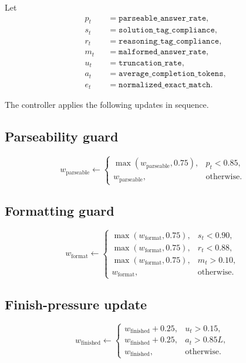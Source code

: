 \documentclass[11pt]{article}
\begin{document}
Let
\begin{align*}
&p_t &&= \texttt{parseable\_answer\_rate}, \\
&s_t &&= \texttt{solution\_tag\_compliance}, \\
&r_t &&= \texttt{reasoning\_tag\_compliance}, \\
&m_t &&= \texttt{malformed\_answer\_rate}, \\
&u_t &&= \texttt{truncation\_rate}, \\
&a_t &&= \texttt{average\_completion\_tokens}, \\
&e_t &&= \texttt{normalized\_exact\_match}.
\end{align*}

The controller applies the following updates in sequence.

\subsection*{Parseability guard}
\[
w_{\mathrm{parseable}}
\leftarrow
\begin{cases}
\max(w_{\mathrm{parseable}}, 0.75), & p_t < 0.85, \\
w_{\mathrm{parseable}}, & \text{otherwise.}
\end{cases}
\]

\subsection*{Formatting guard}
\[
w_{\mathrm{format}}
\leftarrow
\begin{cases}
\max(w_{\mathrm{format}}, 0.75), & s_t < 0.90, \\
\max(w_{\mathrm{format}}, 0.75), & r_t < 0.88, \\
\max(w_{\mathrm{format}}, 0.75), & m_t > 0.10, \\
w_{\mathrm{format}}, & \text{otherwise.}
\end{cases}
\]

\subsection*{Finish-pressure update}
\[
w_{\mathrm{finished}}
\leftarrow
\begin{cases}
w_{\mathrm{finished}} + 0.25, & u_t > 0.15, \\
w_{\mathrm{finished}} + 0.25, & a_t > 0.85L, \\
w_{\mathrm{finished}}, & \text{otherwise.}
\end{cases}
\]
\end{document}
